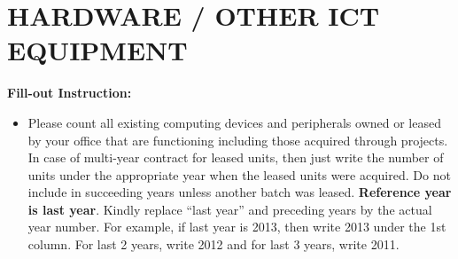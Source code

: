 \documentclass[a4paper,10pt, total={10.95in, 8in}]{article} %
\newcommand\tab[1][0.30cm]{\hspace*{#1}}
\begin{document}
\section{HARDWARE / OTHER ICT EQUIPMENT}
\textbf{Fill-out Instruction:}
\begin{itemize}[left=3.5em]
\item \tab Please count all existing computing devices and peripherals owned or leased by your office that are functioning including those acquired through projects. In case of multi-year contract for leased units, then just write the number of units under the appropriate year when the leased units were acquired. Do not include in succeeding years unless another batch was leased. \textbf{Reference year is last year}. Kindly replace “last year” and preceding years by the actual year number. For example, if last year is 2013, then write 2013 under the 1st column. For last 2 years, write 2012 and for last 3 years, write 2011.
\end{itemize}

\end{document}
